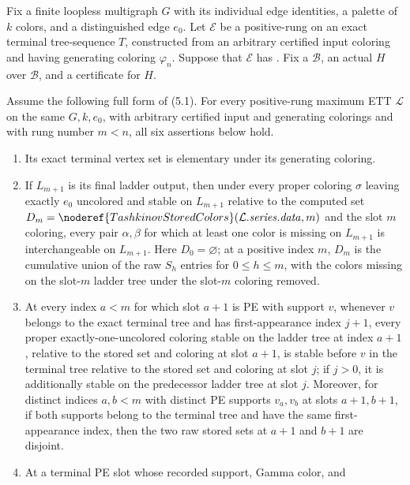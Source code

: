 \begin{theorem}
Fix a finite loopless multigraph \(G\) with its individual edge identities,
a palette of \(k\) colors, and a distinguished edge \(e_0\).  Let
\(\mathcal E\) be a positive-rung
 on an exact terminal tree-sequence \(T\),
constructed from an arbitrary certified input coloring and having generating
coloring \(\varphi_n\).  Suppose that \(\mathcal E\) has
.  Fix a  \(\mathcal B\),
an actual  \(H\) over \(\mathcal B\), and a
 certificate for \(H\).

Assume the following full form of (5.1).  For every positive-rung maximum
ETT \(\mathcal L\) on the same \(G,k,e_0\), with arbitrary certified input
and generating colorings and with rung number \(m<n\), all six assertions
below hold.
\begin{enumerate}
\item Its exact terminal vertex set is elementary under its generating
coloring.
\item If \(L_{m+1}\) is its final ladder output, then under every proper
coloring \(\sigma\) leaving exactly \(e_0\) uncolored and stable on
\(L_{m+1}\) relative to the computed set
\(D_m=\noderef{TashkinovStoredColors}(\mathcal L.\mathit{series.data},m)\)
and the slot \(m\) coloring, every pair \(\alpha,\beta\) for which at least
one color is missing on \(L_{m+1}\) is interchangeable on \(L_{m+1}\).
Here \(D_0=\varnothing\); at a positive index \(m\), \(D_m\) is the
cumulative union of the raw \(S_h\) entries for \(0\leq h\leq m\), with
the colors missing on the slot-\(m\) ladder tree under the slot-\(m\)
coloring removed.
\item At every index \(a<m\) for which slot \(a+1\) is PE with support
\(v\), whenever \(v\) belongs to the exact terminal tree and has
first-appearance index \(j+1\), every proper exactly-one-uncolored coloring
stable on the ladder tree at index \(a+1\), relative to the stored set and
coloring at slot \(a+1\), is stable before \(v\) in the terminal tree
relative to the stored set and coloring at slot \(j\); if \(j>0\), it is
additionally stable on the predecessor ladder tree at slot \(j\).
Moreover, for distinct indices \(a,b<m\) with distinct PE supports
\(v_a,v_b\) at slots \(a+1,b+1\), if both supports belong to the terminal
tree and have the same first-appearance index, then the two raw stored sets
at \(a+1\) and \(b+1\) are disjoint.
\item At a terminal PE slot whose recorded support, Gamma color, and

\end{enumerate}
\end{theorem}
